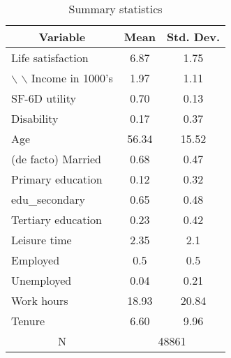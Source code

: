 
\begin{table}[htbp]\centering \caption{Summary statistics \label{descstat}}
\begin{tabular}{l c c  }\hline\hline
\multicolumn{1}{c}{\textbf{Variable}} & \textbf{Mean}
 & \textbf{Std. Dev.} \\ \hline
Life satisfaction & 6.87 & 1.75  \\
$\backslash$ $\backslash$  Income in 1000's & 1.97 & 1.11  \\
SF-6D utility & 0.70 & 0.13  \\
Disability & 0.17 & 0.37  \\
Age & 56.34 & 15.52  \\
(de facto) Married & 0.68 & 0.47  \\
Primary education & 0.12 & 0.32  \\
edu\_secondary & 0.65 & 0.48  \\
Tertiary education & 0.23 & 0.42  \\
Leisure time & 2.35 & 2.1  \\
Employed & 0.5 & 0.5  \\
Unemployed & 0.04 & 0.21  \\
Work hours & 18.93 & 20.84  \\
Tenure & 6.60 & 9.96  \\
\multicolumn{1}{c}{N} & \multicolumn{2}{c}{48861}\\ \hline\end{tabular}
\end{table}
